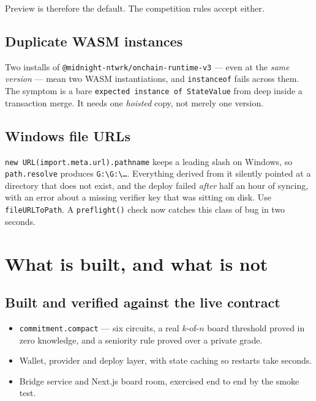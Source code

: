 \documentclass[11pt,a4paper]{article}
\begin{document}
\vspace{4pt}
Preview is therefore the default. The competition rules accept either.

\subsection{Duplicate WASM instances}

Two installs of \texttt{@midnight-ntwrk/onchain-runtime-v3} --- even at the \emph{same version} --- mean
two WASM instantiations, and \texttt{instanceof} fails across them. The symptom is a bare
\texttt{expected instance of StateValue} from deep inside a transaction merge. It needs one \emph{hoisted}
copy, not merely one version.

\subsection{Windows file URLs}

\texttt{new URL(import.meta.url).pathname} keeps a leading slash on Windows, so \texttt{path.resolve}
produces \texttt{G:\textbackslash G:\textbackslash\ldots}. Everything derived from it silently pointed at
a directory that does not exist, and the deploy failed \emph{after} half an hour of syncing, with an error
about a missing verifier key that was sitting on disk. Use \texttt{fileURLToPath}. A
\texttt{preflight()} check now catches this class of bug in two seconds.

\section{What is built, and what is not}

\subsection{Built and verified against the live contract}

\begin{itemize}
  \item \texttt{commitment.compact} --- six circuits, a real $k$-of-$n$ board threshold proved in zero
    knowledge, and a seniority rule proved over a private grade.
  \item Wallet, provider and deploy layer, with state caching so restarts take seconds.
  \item Bridge service and Next.js board room, exercised end to end by the smoke test.
\end{itemize}
\end{document}
